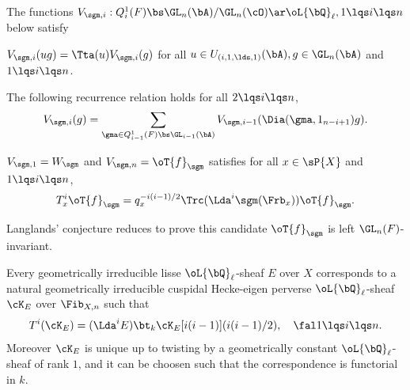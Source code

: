 \documentclass[a4paper, twoside]{article}
\begin{document}
\begin{thm}
	The functions $V_{\sgm,i}:Q_{i}^{1}(F)\bs\GL_{n}(\bA)/\GL_{n}(\cO)\ar\oL{\bQ}_{\ell},1\lqs i\lqs n$ below satisfy
	\begin{itm}
		\item $V_{\sgm,i}(ug)=\Tta(u)V_{\sgm,i}(g)$ for all $u\in U_{(i,1,\lds,1)}(\bA),g\in\GL_{n}(\bA)$ and $1\lqs i\lqs n$.
		\item The following recurrence relation holds for all $2\lqs i\lqs n$,
		\[
			V_{\sgm,i}(g)=\sum_{\gma\in Q_{i-1}^{1}(F)\bs\GL_{i-1}(\bA)}V_{\sgm,i-1}(\Dia(\gma,1_{n-i+1})g).
		\]
		\item $V_{\sgm,1}=W_{\sgm}$ and $V_{\sgm,n}=\oT{f}_{\sgm}$ satisfies for all $x\in\sP{X}$ and $1\lqs i\lqs n$,
		\[
			T_{x}^{i}\oT{f}_{\sgm}=q_{x}^{-i(i-1)/2}\Trc(\Lda^{i}\sgm(\Frb_{x}))\oT{f}_{\sgm}.
		\]
	\end{itm}
\end{thm}

\begin{rmk}
	Langlands' conjecture reduces to prove this candidate $\oT{f}_{\sgm}$ is left $\GL_{n}(F)$-invariant.
\end{rmk}


\begin{cnj}
	Every geometrically irreducible lisse $\oL{\bQ}_{\ell}$-sheaf $E$ over $X$ corresponds to a natural geometrically irreducible cuspidal Hecke-eigen perverse $\oL{\bQ}_{\ell}$-sheaf $\cK_{E}$ over $\Fib_{X,n}$ such that
	\[
		T^{i}(\cK_{E})=(\Lda^{i}E)\bt_{k}\cK_{E}[i(i-1)](i(i-1)/2),\quad \fal 1\lqs i\lqs n.
	\]
	Moreover $\cK_{E}$ is unique up to twisting by a geometrically constant $\oL{\bQ}_{\ell}$-sheaf of rank $1$, and it can be choosen such that the correspondence is functorial in $k$.
\end{cnj}
\end{document}

